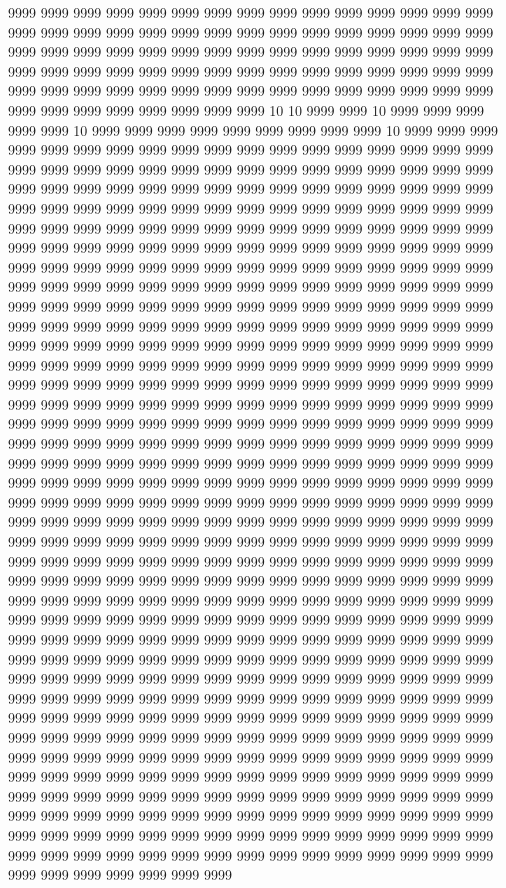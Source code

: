 9999 9999 9999 9999 9999 9999 9999 9999 9999 9999 9999 9999 9999 9999 9999 9999 9999 9999 9999 9999 9999 9999 9999 9999 9999 9999 9999 9999 9999 9999 9999 9999 9999 9999 9999 9999 9999 9999 9999 9999 9999 9999 9999 9999 9999 9999 9999 9999 9999 9999 9999 9999 9999 9999 9999 9999 9999 9999 9999 9999 9999 9999 9999 9999 9999 9999 9999 9999 9999 9999 9999 9999 9999 9999 9999 9999 9999 9999 9999 9999 9999 9999 9999 10 10 9999 9999 10 9999 9999 9999 9999 9999 10 9999 9999 9999 9999 9999 9999 9999 9999 9999 10 9999 9999 9999 9999 9999 9999 9999 9999 9999 9999 9999 9999 9999 9999 9999 9999 9999 9999 9999 9999 9999 9999 9999 9999 9999 9999 9999 9999 9999 9999 9999 9999 9999 9999 9999 9999 9999 9999 9999 9999 9999 9999 9999 9999 9999 9999 9999 9999 9999 9999 9999 9999 9999 9999 9999 9999 9999 9999 9999 9999 9999 9999 9999 9999 9999 9999 9999 9999 9999 9999 9999 9999 9999 9999 9999 9999 9999 9999 9999 9999 9999 9999 9999 9999 9999 9999 9999 9999 9999 9999 9999 9999 9999 9999 9999 9999 9999 9999 9999 9999 9999 9999 9999 9999 9999 9999 9999 9999 9999 9999 9999 9999 9999 9999 9999 9999 9999 9999 9999 9999 9999 9999 9999 9999 9999 9999 9999 9999 9999 9999 9999 9999 9999 9999 9999 9999 9999 9999 9999 9999 9999 9999 9999 9999 9999 9999 9999 9999 9999 9999 9999 9999 9999 9999 9999 9999 9999 9999 9999 9999 9999 9999 9999 9999 9999 9999 9999 9999 9999 9999 9999 9999 9999 9999 9999 9999 9999 9999 9999 9999 9999 9999 9999 9999 9999 9999 9999 9999 9999 9999 9999 9999 9999 9999 9999 9999 9999 9999 9999 9999 9999 9999 9999 9999 9999 9999 9999 9999 9999 9999 9999 9999 9999 9999 9999 9999 9999 9999 9999 9999 9999 9999 9999 9999 9999 9999 9999 9999 9999 9999 9999 9999 9999 9999 9999 9999 9999 9999 9999 9999 9999 9999 9999 9999 9999 9999 9999 9999 9999 9999 9999 9999 9999 9999 9999 9999 9999 9999 9999 9999 9999 9999 9999 9999 9999 9999 9999 9999 9999 9999 9999 9999 9999 9999 9999 9999 9999 9999 9999 9999 9999 9999 9999 9999 9999 9999 9999 9999 9999 9999 9999 9999 9999 9999 9999 9999 9999 9999 9999 9999 9999 9999 9999 9999 9999 9999 9999 9999 9999 9999 9999 9999 9999 9999 9999 9999 9999 9999 9999 9999 9999 9999 9999 9999 9999 9999 9999 9999 9999 9999 9999 9999 9999 9999 9999 9999 9999 9999 9999 9999 9999 9999 9999 9999 9999 9999 9999 9999 9999 9999 9999 9999 9999 9999 9999 9999 9999 9999 9999 9999 9999 9999 9999 9999 9999 9999 9999 9999 9999 9999 9999 9999 9999 9999 9999 9999 9999 9999 9999 9999 9999 9999 9999 9999 9999 9999 9999 9999 9999 9999 9999 9999 9999 9999 9999 9999 9999 9999 9999 9999 9999 9999 9999 9999 9999 9999 9999 9999 9999 9999 9999 9999 9999 9999 9999 9999 9999 9999 9999 9999 9999 9999 9999 9999 9999 9999 9999 9999 9999 9999 9999 9999 9999 9999 9999 9999 9999 9999 9999 9999 9999 9999 9999 9999 9999 9999 9999 9999 9999 9999 9999 9999 9999 9999 9999 9999 9999 9999 9999 9999 9999 9999 9999 9999 9999 9999 9999 9999 9999 9999 9999 9999 9999 9999 9999 9999 9999 9999 9999 9999 9999 9999 9999 9999 9999 9999 9999 9999 9999 9999 9999 9999 9999 9999 9999 9999 9999 9999 9999 9999 9999 9999 9999 9999 9999 9999 9999 9999 9999 9999 9999 9999 9999 9999 9999 9999 9999 9999 9999 9999 9999 9999 9999 9999 9999 9999 9999 9999 9999 9999 9999 9999 9999 9999 9999 9999 9999 9999 9999 9999 9999 9999 9999 9999 9999 9999 9999 9999 9999 9999 9999 9999 9999 9999 9999 9999 9999 9999 9999 9999 9999 9999 9999 9999 9999 